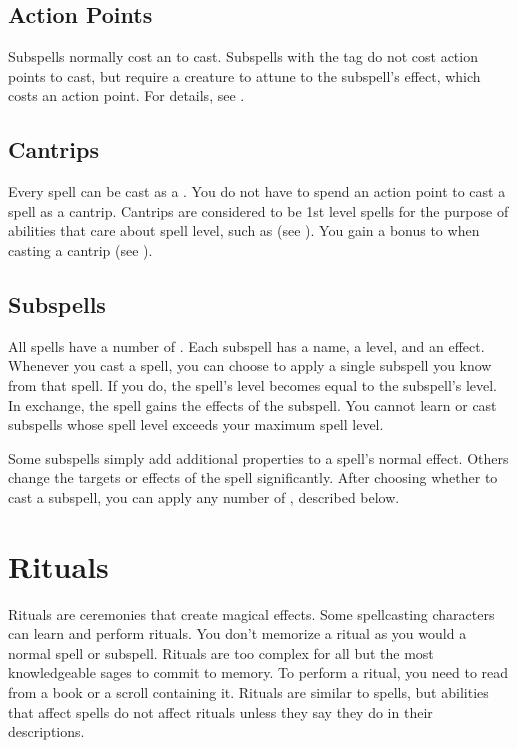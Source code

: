     \subsection{Action Points}
        Subspells normally cost an  to cast.
        Subspells with the  tag do not cost action points to cast, but require a creature to attune to the subspell's effect, which costs an action point.
        For details, see .

    \subsection{Cantrips}\label{Cantrips}
        Every spell can be cast as a .
        You do not have to spend an action point to cast a spell as a cantrip.
        Cantrips are considered to be 1st level spells for the purpose of abilities that care about spell level, such as  (see ).
        You gain a  bonus to  when casting a cantrip (see ).

    \subsection{Subspells}\label{Subspells}
        All spells have a number of .
        Each subspell has a name, a level, and an effect.
        Whenever you cast a spell, you can choose to apply a single subspell you know from that spell.
        If you do, the spell's level becomes equal to the subspell's level.
        In exchange, the spell gains the effects of the subspell.
        You cannot learn or cast subspells whose spell level exceeds your maximum spell level.

        Some subspells simply add additional properties to a spell's normal effect.
        Others change the targets or effects of the spell significantly.
        After choosing whether to cast a subspell, you can apply any number of , described below.

\section{Rituals}\label{Rituals}
    Rituals are ceremonies that create magical effects.
    Some spellcasting characters can learn and perform rituals.
    You don't memorize a ritual as you would a normal spell or subspell.
    Rituals are too complex for all but the most knowledgeable sages to commit to memory.
    To perform a ritual, you need to read from a book or a scroll containing it.
    Rituals are similar to spells, but abilities that affect spells do not affect rituals unless they say they do in their descriptions.


